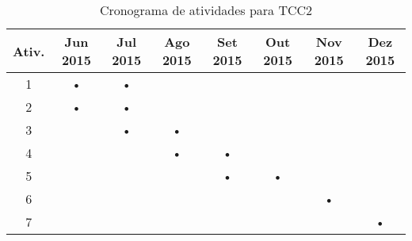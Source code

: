 \newpage

\begin{table}[h]
    \centering
    \begin{tabular}{|c|c|c|c|c|c|c|c|}
        \hline
        \textbf{Ativ.} & \textbf{Jun 2015}&\textbf{Jul 2015} & \textbf{Ago 2015} & \textbf{Set 2015}
        & \textbf{Out 2015} & \textbf{Nov 2015} & \textbf{Dez 2015} \\
        \hline\hline

        \hline
        1   & •& • &  &   &   &   &   \\

        \hline
        2   &•& • &   &&   &   &   \\

        \hline
        3   &   &  • & • & &   &   &   \\

        \hline
        4   &  &   & • &• & &   &   \\

        \hline
        5   & &  &   & • &•  &   &   \\

        \hline
        6   &  & &   &   &  & • &   \\

        \hline
        7   &   &&   &   & &  & •  \\
        \hline
    \end{tabular}

    \caption{Cronograma de atividades para TCC2}
    \label{cronograma}
\end{table}
